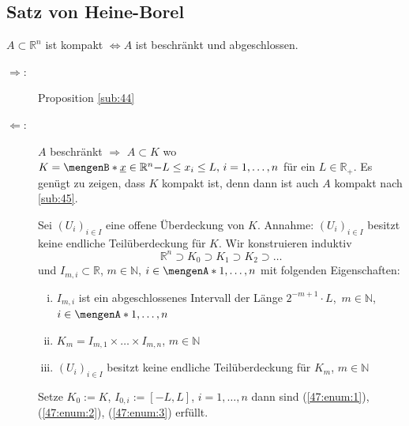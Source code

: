 \subsection{Satz von Heine-Borel} %
\label{sub:47}
$A \subset \mathds{R}^n$ ist kompakt $\iff A $ ist beschränkt und abgeschlossen.
\begin{description}
	\item[\glqq$\Rightarrow$\grqq:] Proposition \ref{sub:44}
	\item[\glqq$\Leftarrow$\grqq:] $A$ beschränkt $\Rightarrow $ $A \subset K$ wo $K = \set[\underline{x} \in \mathds{R}^n]{- L \le x_i \le L,\, i=1,\ldots ,n} $ 
	für ein $L \in \mathds{R}_+$. Es genügt zu zeigen, dass $K$ kompakt ist, denn dann ist auch $A$ kompakt nach \ref{sub:45}.
	
	Sei $(U_i)_{i \in I}$ eine offene Überdeckung von $K$. Annahme: $(U_i)_{i \in I}$ besitzt keine endliche Teilüberdeckung für $K$. Wir konstruieren induktiv
	\[
		\mathds{R}^n \supset K_0 \supset K_1 \supset K_2 \supset \ldots 
	\]
	und $I_{m,i} \subset \mathds{R}$, $m \in \mathds{N}$, $i \in \set{1, \ldots ,n} $ mit folgenden Eigenschaften:
	\begin{enumerate}[(i)]
		\item \label{47:enum:1} $I_{m,i}$ ist ein abgeschlossenes Intervall der Länge $2^{-m+1} \cdot L$, $\, m \in \mathds{N}$, $i \in  \set{1, \ldots ,n} $
		\item \label{47:enum:2} $K_m = I_{m,1} \times \ldots \times I_{m,n}$, $m \in \mathds{N}$
		\item \label{47:enum:3}$(U_i)_{i \in I}$ besitzt keine endliche Teilüberdeckung für $K_m$, $m \in \mathds{N}$
	\end{enumerate}
	\begin{figure}[ht]
	\end{figure}
	Setze $K_0 := K $, $I_{0,i} := [-L,L]$, $i=1,\ldots ,n$ dann sind (\ref{47:enum:1}), (\ref{47:enum:2}), (\ref{47:enum:3}) erfüllt.
	

\end{description}
